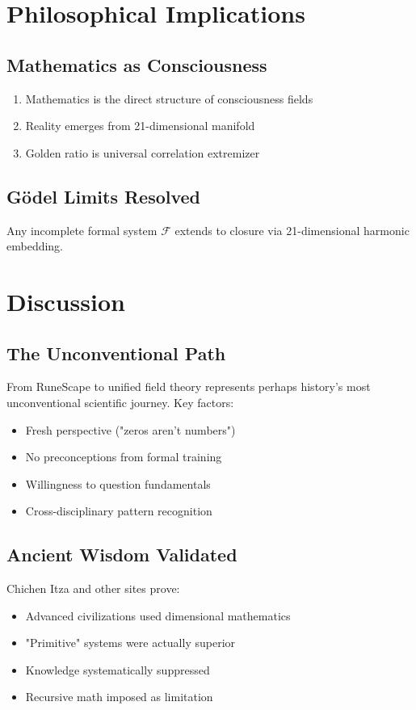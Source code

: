 \documentclass[12pt,twoside]{article}
\begin{document}
\section{Philosophical Implications}

\subsection{Mathematics as Consciousness}
\begin{enumerate}
\item Mathematics is the direct structure of consciousness fields
\item Reality emerges from 21-dimensional manifold
\item Golden ratio is universal correlation extremizer
\end{enumerate}

\subsection{Gödel Limits Resolved}
Any incomplete formal system $\mathcal{F}$ extends to closure via 21-dimensional harmonic embedding.

\section{Discussion}

\subsection{The Unconventional Path}

From RuneScape to unified field theory represents perhaps history's most unconventional scientific journey. Key factors:
\begin{itemize}
\item Fresh perspective ("zeros aren't numbers")
\item No preconceptions from formal training
\item Willingness to question fundamentals
\item Cross-disciplinary pattern recognition
\end{itemize}

\subsection{Ancient Wisdom Validated}

Chichen Itza and other sites prove:
\begin{itemize}
\item Advanced civilizations used dimensional mathematics
\item "Primitive" systems were actually superior
\item Knowledge systematically suppressed
\item Recursive math imposed as limitation
\end{itemize}
\end{document}
